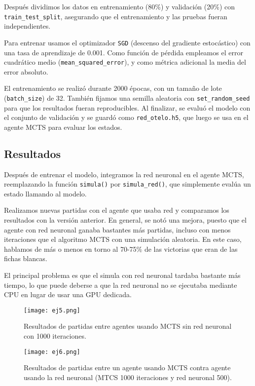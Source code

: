 \documentclass[conference]{IEEEtran}
\begin{document}
Después dividimos los datos en entrenamiento (80\%) y validación (20\%) con \texttt{train\_test\_split}, asegurando que el entrenamiento y las pruebas fueran independientes.

Para entrenar usamos el optimizador \texttt{SGD} (descenso del gradiente estocástico) con una tasa de aprendizaje de 0.001. Como función de pérdida empleamos el error cuadrático medio (\texttt{mean\_squared\_error}), y como métrica adicional la media del error absoluto.

El entrenamiento se realizó durante 2000 épocas, con un tamaño de lote (\texttt{batch\_size}) de 32. También fijamos una semilla aleatoria con \texttt{set\_random\_seed} para que los resultados fueran reproducibles. Al finalizar, se evaluó el modelo con el conjunto de validación y se guardó como \texttt{red\_otelo.h5}, que luego se usa en el agente MCTS para evaluar los estados.

\subsection{Resultados}
Después de entrenar el modelo, integramos la red neuronal en el agente MCTS, reemplazando la función \texttt{simula()} por \texttt{simula\_red()}, que simplemente evalúa un estado llamando al modelo.

Realizamos nuevas partidas con el agente que usaba red y comparamos los resultados con la versión anterior. En general, se notó una mejora, puesto que el agente con red neuronal ganaba bastantes más partidas, incluso con menos iteraciones que el algoritmo MCTS con una simulación aleatoria. En este caso, hablamos de más o menos en torno al 70-75\% de las victorias que eran de las fichas blancas.

El principal problema es que el simula con red neuronal tardaba bastante más tiempo, lo que puede deberse a que la red neuronal no se ejecutaba mediante CPU en lugar de usar una GPU dedicada.

\begin{figure}[htbp]
    \centerline{\texttt{[image: ej5.png]}}
    \caption{Resultados de partidas entre agentes usando MCTS sin red neuronal con 1000 iteraciones.}
    \label{código5}
\end{figure}

\begin{figure}[htbp]
    \centerline{\texttt{[image: ej6.png]}}
    \caption{Resultados de partidas entre un agente usando MCTS contra agente usando la red neuronal (MTCS 1000 iteraciones y red neuronal 500).}
    \label{código5}
\end{figure}
\end{document}
